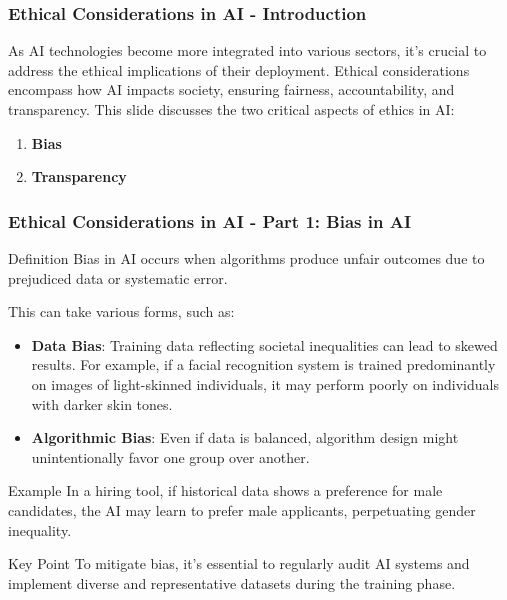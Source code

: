 \documentclass[aspectratio=169]{beamer}
\begin{document}
\begin{frame}[fragile]
    \frametitle{Ethical Considerations in AI - Introduction}
    As AI technologies become more integrated into various sectors, it’s crucial to address the ethical implications of their deployment. Ethical considerations encompass how AI impacts society, ensuring fairness, accountability, and transparency. This slide discusses the two critical aspects of ethics in AI:
    \begin{enumerate}
        \item \textbf{Bias}
        \item \textbf{Transparency}
    \end{enumerate}
\end{frame}

\begin{frame}[fragile]
    \frametitle{Ethical Considerations in AI - Part 1: Bias in AI}
    \begin{block}{Definition}
    Bias in AI occurs when algorithms produce unfair outcomes due to prejudiced data or systematic error.
    \end{block}
    
    This can take various forms, such as:
    \begin{itemize}
        \item \textbf{Data Bias}: Training data reflecting societal inequalities can lead to skewed results. For example, if a facial recognition system is trained predominantly on images of light-skinned individuals, it may perform poorly on individuals with darker skin tones.
        \item \textbf{Algorithmic Bias}: Even if data is balanced, algorithm design might unintentionally favor one group over another.
    \end{itemize}
    
    \begin{block}{Example}
    In a hiring tool, if historical data shows a preference for male candidates, the AI may learn to prefer male applicants, perpetuating gender inequality.
    \end{block}
    
    \begin{block}{Key Point}
    To mitigate bias, it’s essential to regularly audit AI systems and implement diverse and representative datasets during the training phase.
    \end{block}
\end{frame}
\end{document}
